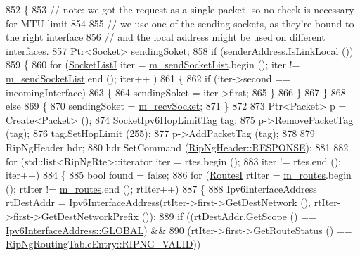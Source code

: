 \begin{DoxyCode}
852     \{
853       \textcolor{comment}{// note: we got the request as a single packet, so no check is necessary for MTU limit}
854 
855       \textcolor{comment}{// we use one of the sending sockets, as they're bound to the right interface}
856       \textcolor{comment}{// and the local address might be used on different interfaces.}
857       Ptr<Socket> sendingSoket;
858       \textcolor{keywordflow}{if} (senderAddress.IsLinkLocal ())
859         \{
860           \textcolor{keywordflow}{for} (\hyperlink{classns3_1_1RipNg_a549052bbb55168d029f82d78384144b4}{SocketListI} iter = \hyperlink{classns3_1_1RipNg_a761d304dc3d34cd528afe87c5fa8090b}{m\_sendSocketList}.begin (); iter != 
      \hyperlink{classns3_1_1RipNg_a761d304dc3d34cd528afe87c5fa8090b}{m\_sendSocketList}.end (); iter++ )
861             \{
862               \textcolor{keywordflow}{if} (iter->second == incomingInterface)
863                 \{
864                   sendingSoket = iter->first;
865                 \}
866             \}
867         \}
868       \textcolor{keywordflow}{else}
869         \{
870           sendingSoket = \hyperlink{classns3_1_1RipNg_a87437a46d9f4e0951f9d4c6b11208d4f}{m\_recvSocket};
871         \}
872 
873       Ptr<Packet> p = Create<Packet> ();
874       SocketIpv6HopLimitTag tag;
875       p->RemovePacketTag (tag);
876       tag.SetHopLimit (255);
877       p->AddPacketTag (tag);
878 
879       RipNgHeader hdr;
880       hdr.SetCommand (\hyperlink{classns3_1_1RipNgHeader_ad96724d6f6fdb4ffa22fe71a0ff12bd2a787536902c0e1912fd0c234def4c32b7}{RipNgHeader::RESPONSE});
881 
882       \textcolor{keywordflow}{for} (std::list<RipNgRte>::iterator iter = rtes.begin ();
883           iter != rtes.end (); iter++)
884         \{
885           \textcolor{keywordtype}{bool} found = \textcolor{keyword}{false};
886           \textcolor{keywordflow}{for} (\hyperlink{classns3_1_1RipNg_aa8bc6103d67089e1e3cd507936f94887}{RoutesI} rtIter = \hyperlink{classns3_1_1RipNg_acfc1011b140f9e612a8c27c9bfb4c6b5}{m\_routes}.begin (); rtIter != 
      \hyperlink{classns3_1_1RipNg_acfc1011b140f9e612a8c27c9bfb4c6b5}{m\_routes}.end (); rtIter++)
887             \{
888               Ipv6InterfaceAddress rtDestAddr = Ipv6InterfaceAddress(rtIter->first->GetDestNetwork (), 
      rtIter->first->GetDestNetworkPrefix ());
889               \textcolor{keywordflow}{if} ((rtDestAddr.GetScope () == \hyperlink{classns3_1_1Ipv6InterfaceAddress_ad3f03debf9dae475b81ea9cdf81f4f27aaf504a3b8c1562206e6ba65b4a6cff1d}{Ipv6InterfaceAddress::GLOBAL}) &&
890                   (rtIter->first->GetRouteStatus () == 
      \hyperlink{classns3_1_1RipNgRoutingTableEntry_af723fc23e97afdd05c55da5162b7e673a334e33ca88fb2b8de53c814814d3c017}{RipNgRoutingTableEntry::RIPNG\_VALID}))

\end{DoxyCode}
